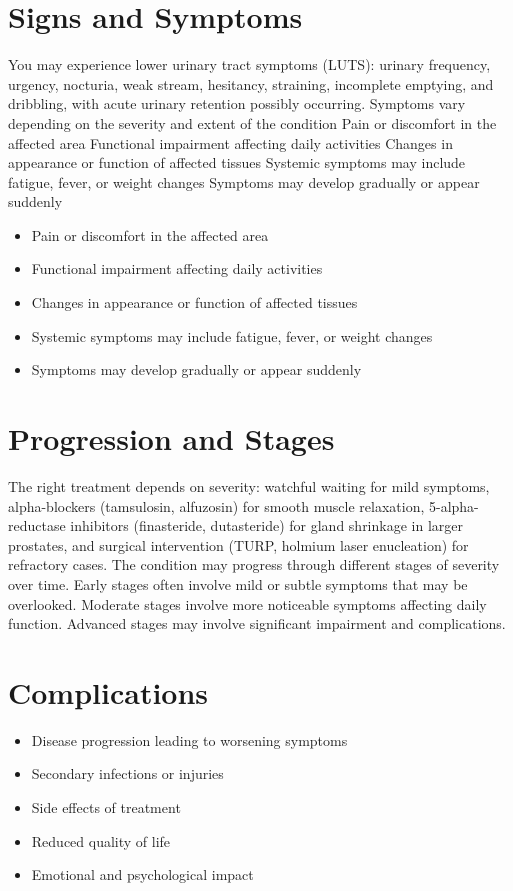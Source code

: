 \section{Signs and Symptoms}
You may experience lower urinary tract symptoms (LUTS): urinary frequency, urgency, nocturia, weak stream, hesitancy, straining, incomplete emptying, and dribbling, with acute urinary retention possibly occurring. Symptoms vary depending on the severity and extent of the condition Pain or discomfort in the affected area Functional impairment affecting daily activities Changes in appearance or function of affected tissues Systemic symptoms may include fatigue, fever, or weight changes Symptoms may develop gradually or appear suddenly

\begin{itemize}[noitemsep]
  \item Pain or discomfort in the affected area
  \item Functional impairment affecting daily activities
  \item Changes in appearance or function of affected tissues
  \item Systemic symptoms may include fatigue, fever, or weight changes
  \item Symptoms may develop gradually or appear suddenly
\end{itemize}
\section{Progression and Stages}
The right treatment depends on severity: watchful waiting for mild symptoms, alpha-blockers (tamsulosin, alfuzosin) for smooth muscle relaxation, 5-alpha-reductase inhibitors (finasteride, dutasteride) for gland shrinkage in larger prostates, and surgical intervention (TURP, holmium laser enucleation) for refractory cases. The condition may progress through different stages of severity over time. Early stages often involve mild or subtle symptoms that may be overlooked. Moderate stages involve more noticeable symptoms affecting daily function. Advanced stages may involve significant impairment and complications.
\section{Complications}
\begin{itemize}[noitemsep]
  \item Disease progression leading to worsening symptoms
  \item Secondary infections or injuries
  \item Side effects of treatment
  \item Reduced quality of life
  \item Emotional and psychological impact
\end{itemize}
